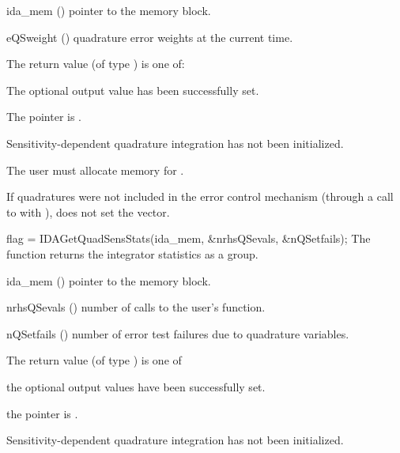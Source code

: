 {
  \begin{args}[eQSweight]
  \item[ida\_mem] ()
    pointer to the {\idas} memory block.
  \item[eQSweight] ()
    quadrature error weights at the current time.
  \end{args}
}
{
  The return value  (of type ) is one of:
  \begin{args}
  \item[\Id{IDA\_SUCCESS}] 
    The optional output value has been successfully set.
  \item[\Id{IDA\_MEM\_NULL}]
    The  pointer is .
  \item[\Id{IDA\_NO\_QUADSENS}]
    Sensitivity-dependent quadrature integration has not been initialized.
  \end{args}
}
{
  {\warn}The user must allocate memory for .

  If quadratures were not included in the error control mechanism (through a 
  call to  with ), 
   does not set the  vector.
}
{
  flag = IDAGetQuadSensStats(ida\_mem, \&nrhsQSevals, \&nQSetfails);
}
{
  The function  returns the {\idas} integrator statistics
  as a group.
}
{
  \begin{args}[nrhsQSevals]
  \item[ida\_mem] ()
    pointer to the {\idas} memory block.
  \item[nrhsQSevals] ()
    number of calls to the user's  function.
  \item[nQSetfails] ()
    number of error test failures due to quadrature variables.
  \end{args}
}
{
  The return value  (of type ) is one of
  \begin{args}
  \item[\Id{IDA\_SUCCESS}] 
    the optional output values have been successfully set.
  \item[\Id{IDA\_MEM\_NULL}]
    the  pointer is .
  \item[\Id{IDA\_NO\_QUADSENS}]
    Sensitivity-dependent quadrature integration has not been initialized.
  \end{args}
}
{}

